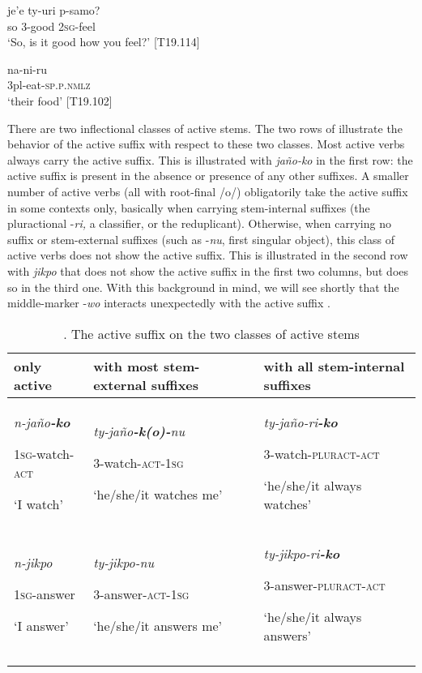 \documentclass[output=paper]{langscibook}
\begin{document}
\ea
\label{ex:Rose:7}
\gll je'e ty-uri p-samo?\\
so 3-good 2\textsc{sg}-feel\\
\glt ‘So, is it good how you feel?’ [T19.114]
\z

\ea
\label{ex:Rose:8}
\gll na-ni-ru\\
3pl-eat-\textsc{sp.p.nmlz}\\
\glt ‘their food’ [T19.102]
\z


There are two inflectional classes of active stems. The two rows of  illustrate the behavior of the active suffix with respect to these two classes. Most active verbs always carry the active suffix. This is illustrated with \textit{j}\textit{año-ko} in the first row: the active suffix is present in the absence or presence of any other suffixes. A smaller number of active verbs (all with root-final /o/) obligatorily take the active suffix in some contexts only, basically when carrying stem-internal suffixes (the pluractional -\textit{ri,} a classifier, or the reduplicant). Otherwise, when carrying no suffix or stem-external suffixes (such as -\textit{nu}, first singular object), this class of active verbs does not show the active suffix. This is illustrated in the second row with \textit{j}\textit{ikpo} that does not show the active suffix in the first two columns, but does so in the third one. With this background in mind, we will see shortly that the middle-marker -\textit{wo} interacts unexpectedly with the active suffix .

\begin{table}
\caption{\label{tab:Rose:2}. The active suffix on the two classes of active stems}


\begin{tabularx}{\textwidth}{p{2cm}XX}

\lsptoprule
only active & with most stem-external suffixes & with all stem-internal suffixes\\
\hline
\textit{n-jaño}\textbf{\textit{-ko}}

1\textsc{sg}-watch-\textsc{act}

`I watch' & \textit{ty-jaño}\textbf{\textit{-k(o)-}}\textit{nu}

3-watch-\textsc{act-}1\textsc{sg}

`he/she/it watches me' & \textit{ty-jaño-ri}\textbf{\textit{-ko}}

3-watch-\textsc{pluract-act}

`he/she/it always watches'\\
\textit{n-jikpo}

1\textsc{sg}-answer

`I answer' & \textit{ty-jikpo-nu}

3-answer-\textsc{act-}1\textsc{sg}

`he/she/it answers me' & \textit{ty-jikpo-ri}\textbf{\textit{-ko}}

3-answer-\textsc{pluract-act}

`he/she/it always answers'\\
\lspbottomrule
\end{tabularx}
\end{table}
\end{document}
